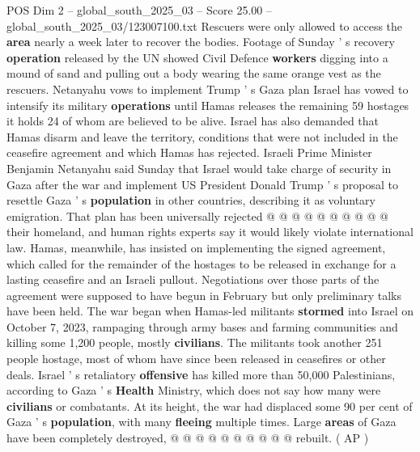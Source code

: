 \begin{textsample}{POS Dim 2 – global\_south\_2025\_03 – Score 25.00 – global\_south\_2025\_03/123007100.txt}
Rescuers were only allowed to access the \textbf{area} nearly a week later to recover the bodies.
Footage of Sunday ' s recovery \textbf{operation} released by the UN showed Civil Defence \textbf{workers} digging into a mound of sand and pulling out a body wearing the same orange vest as the rescuers.
Netanyahu vows to implement Trump ' s Gaza plan Israel has vowed to intensify its military \textbf{operations} until Hamas releases the remaining 59 hostages it holds 24 of whom are believed to be alive.
Israel has also demanded that Hamas disarm and leave the territory, conditions that were not included in the ceasefire agreement and which Hamas has rejected.
Israeli Prime Minister Benjamin Netanyahu said Sunday that Israel would take charge of security in Gaza after the war and implement US President Donald Trump ' s proposal to resettle Gaza ' s \textbf{population} in other countries, describing it as voluntary emigration.
That plan has been universally rejected @ @ @ @ @ @ @ @ @ @ their homeland, and human rights experts say it would likely violate international law.
Hamas, meanwhile, has insisted on implementing the signed agreement, which called for the remainder of the hostages to be released in exchange for a lasting ceasefire and an Israeli pullout.
Negotiations over those parts of the agreement were supposed to have begun in February but only preliminary talks have been held.
The war began when Hamas-led militants \textbf{stormed} into Israel on October 7, 2023, rampaging through army bases and farming communities and killing some 1,200 people, mostly \textbf{civilians}.
The militants took another 251 people hostage, most of whom have since been released in ceasefires or other deals.
Israel ' s retaliatory \textbf{offensive} has killed more than 50,000 Palestinians, according to Gaza ' s \textbf{Health} Ministry, which does not say how many were \textbf{civilians} or combatants.
At its height, the war had displaced some 90 per cent of Gaza ' s \textbf{population}, with many \textbf{fleeing} multiple times.
Large \textbf{areas} of Gaza have been completely destroyed, @ @ @ @ @ @ @ @ @ @ rebuilt. ( AP )

\end{textsample}
